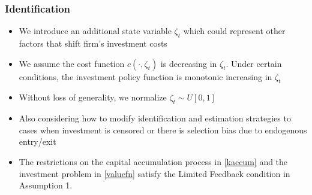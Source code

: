 \documentclass{beamer}
\begin{document}
\begin{frame}
\frametitle{Identification}
\begin{itemize}
\item We introduce an additional state variable $\zeta_{t}$ which could represent other factors that shift firm's investment costs
\item We assume the cost function $c(\cdot, \zeta_{t})$ is decreasing in $\zeta_{t}$. Under certain conditions, the investment policy function is monotonic increasing in $\zeta_{t}$
\item Without loss of generality, we normalize $\zeta_{t}\sim U[0,1]$
\item Also considering how to modify identification and estimation strategies to cases when investment is censored or there is selection bias due to endogenous entry/exit
\item The restrictions on the capital accumulation process in \eqref{kaccum} and the investment problem in \eqref{valuefn} satisfy the Limited Feedback condition in Assumption 1.
\end{itemize}
\end{frame}
\end{document}
